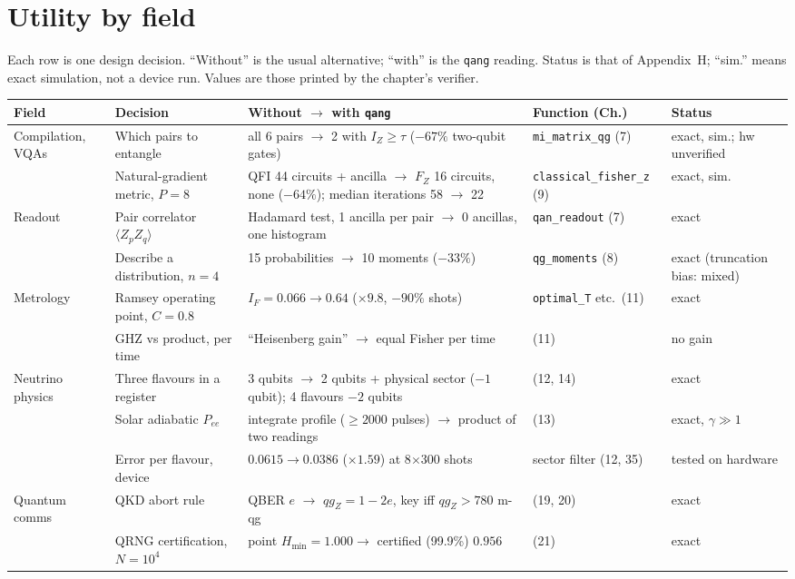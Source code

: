 \documentclass[11pt]{article}
\newcommand{\qgZ}{qg_Z}
\newcommand{\st}[1]{\texttt{#1}}
\begin{document}
\section{Utility by field}
Each row is one design decision. ``Without'' is the usual alternative; ``with'' is the \texttt{qang} reading. Status is that of Appendix~H; ``sim.'' means exact simulation, not a device run. Values are those printed by the chapter's verifier.
\begingroup\footnotesize\setlength{\tabcolsep}{3pt}
\begin{longtable}{@{}L{2.0cm}L{3.6cm}L{4.9cm}L{3.3cm}L{1.9cm}@{}}
\toprule
Field & Decision & Without $\to$ with \texttt{qang} & Function (Ch.) & Status\\\midrule\endhead
Compilation, VQAs & Which pairs to entangle & all 6 pairs $\to$ 2 with $I_Z\ge\tau$ ($-67\%$ two-qubit gates) & \st{mi\_matrix\_qg} (7) & exact, sim.; hw unverified\\
 & Natural-gradient metric, $P=8$ & QFI 44 circuits + ancilla $\to$ $F_Z$ 16 circuits, none ($-64\%$); median iterations 58 $\to$ 22 & \st{classical\_fisher\_z} (9) & exact, sim.\\
Readout & Pair correlator $\langle Z_pZ_q\rangle$ & Hadamard test, 1 ancilla per pair $\to$ 0 ancillas, one histogram & \st{qan\_readout} (7) & exact\\
 & Describe a distribution, $n=4$ & 15 probabilities $\to$ 10 moments ($-33\%$) & \st{qg\_moments} (8) & exact (truncation bias: mixed)\\
Metrology & Ramsey operating point, $C=0.8$ & $I_F=0.066\to0.64$ ($\times9.8$, $-90\%$ shots) & \st{optimal\_T} etc.\ (11) & exact\\
 & GHZ vs product, per time & ``Heisenberg gain'' $\to$ equal Fisher per time & (11) & no gain\\
Neutrino physics & Three flavours in a register & 3 qubits $\to$ 2 qubits + physical sector ($-1$ qubit); 4 flavours $-2$ qubits & (12, 14) & exact\\
 & Solar adiabatic $P_{ee}$ & integrate profile ($\ge2000$ pulses) $\to$ product of two readings & (13) & exact, $\gamma\gg1$\\
 & Error per flavour, device & $0.0615\to0.0386$ ($\times1.59$) at 8$\times$300 shots & sector filter (12, 35) & tested on hardware\\
Quantum comms & QKD abort rule & QBER $e$ $\to$ $\qgZ=1-2e$, key iff $\qgZ>780$ m-qg & (19, 20) & exact\\
 & QRNG certification, $N=10^4$ & point $H_{\min}=1.000\to$ certified (99.9\%) $0.956$ & (21) & exact\\

\end{longtable}
\end{document}
